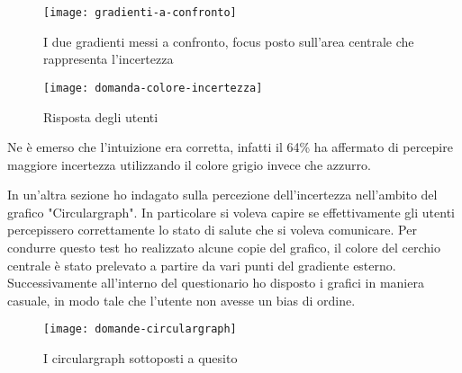 \begin{figure}[!ht] 
    \centering 
    \texttt{[image: gradienti-a-confronto]} 
    \caption{I due gradienti messi a confronto, focus posto sull'area centrale che rappresenta l'incertezza}
\end{figure}


\begin{figure}[!ht] 
    \centering 
    \texttt{[image: domanda-colore-incertezza]}
    \caption{Risposta degli utenti}
\end{figure}

Ne è emerso che l'intuizione era corretta, infatti il 64\% ha affermato di percepire maggiore incertezza utilizzando il colore grigio invece che azzurro. 

In un'altra sezione ho indagato sulla percezione dell'incertezza nell'ambito del grafico "Circulargraph". In particolare si voleva capire se effettivamente gli utenti percepissero correttamente lo stato di salute che si voleva comunicare. Per condurre questo test ho realizzato alcune copie del grafico, il colore del cerchio centrale è stato prelevato a partire da vari punti del gradiente esterno. Successivamente all'interno del questionario ho disposto i grafici in maniera casuale, in modo tale che l'utente non avesse un bias di ordine. \\

\begin{figure}[!ht] 
    \centering 
    \texttt{[image: domande-circulargraph]}
    \caption{I circulargraph sottoposti a quesito}
\end{figure}

